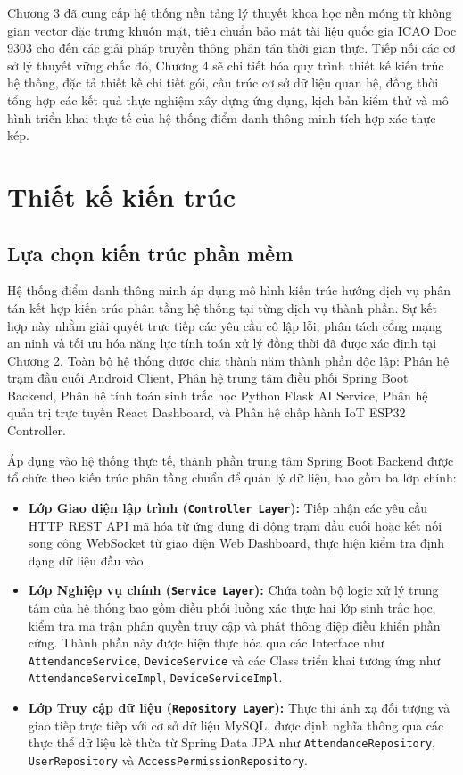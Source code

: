\documentclass[../DoAn.tex]{subfiles}
\begin{document}
Chương 3 đã cung cấp hệ thống nền tảng lý thuyết khoa học nền móng từ không gian vector đặc trưng khuôn mặt, tiêu chuẩn bảo mật tài liệu quốc gia ICAO Doc 9303 cho đến các giải pháp truyền thông phân tán thời gian thực. Tiếp nối các cơ sở lý thuyết vững chắc đó, Chương 4 sẽ chi tiết hóa quy trình thiết kế kiến trúc hệ thống, đặc tả thiết kế chi tiết gói, cấu trúc cơ sở dữ liệu quan hệ, đồng thời tổng hợp các kết quả thực nghiệm xây dựng ứng dụng, kịch bản kiểm thử và mô hình triển khai thực tế của hệ thống điểm danh thông minh tích hợp xác thực kép.

\section{Thiết kế kiến trúc}
\label{section:4.1}

\subsection{Lựa chọn kiến trúc phần mềm}

Hệ thống điểm danh thông minh áp dụng mô hình kiến trúc hướng dịch vụ phân tán kết hợp kiến trúc phân tầng hệ thống tại từng dịch vụ thành phần. Sự kết hợp này nhằm giải quyết trực tiếp các yêu cầu cô lập lỗi, phân tách cổng mạng an ninh và tối ưu hóa năng lực tính toán xử lý đồng thời đã được xác định tại Chương 2. Toàn bộ hệ thống được chia thành năm thành phần độc lập: Phân hệ trạm đầu cuối Android Client, Phân hệ trung tâm điều phối Spring Boot Backend, Phân hệ tính toán sinh trắc học Python Flask AI Service, Phân hệ quản trị trực tuyến React Dashboard, và Phân hệ chấp hành IoT ESP32 Controller.

Áp dụng vào hệ thống thực tế, thành phần trung tâm Spring Boot Backend được tổ chức theo kiến trúc phân tầng chuẩn để quản lý dữ liệu, bao gồm ba lớp chính:
\begin{itemize}
    \item \textbf{Lớp Giao diện lập trình (\texttt{Controller Layer}):} Tiếp nhận các yêu cầu HTTP REST API mã hóa từ ứng dụng di động trạm đầu cuối hoặc kết nối song công WebSocket từ giao diện Web Dashboard, thực hiện kiểm tra định dạng dữ liệu đầu vào.
    \item \textbf{Lớp Nghiệp vụ chính (\texttt{Service Layer}):} Chứa toàn bộ logic xử lý trung tâm của hệ thống bao gồm điều phối luồng xác thực hai lớp sinh trắc học, kiểm tra ma trận phân quyền truy cập và phát thông điệp điều khiển phần cứng. Thành phần này được hiện thực hóa qua các Interface như \texttt{AttendanceService}, \texttt{DeviceService} và các Class triển khai tương ứng như \texttt{AttendanceServiceImpl}, \texttt{DeviceServiceImpl}.
    \item \textbf{Lớp Truy cập dữ liệu (\texttt{Repository Layer}):} Thực thi ánh xạ đối tượng và giao tiếp trực tiếp với cơ sở dữ liệu MySQL, được định nghĩa thông qua các thực thể dữ liệu kế thừa từ Spring Data JPA như \texttt{AttendanceRepository}, \texttt{UserRepository} và \texttt{AccessPermissionRepository}.
\end{itemize}
\end{document}
